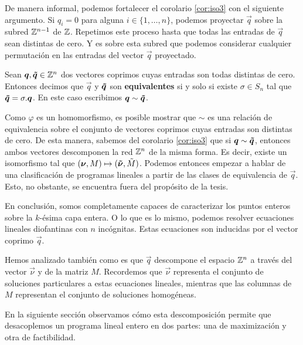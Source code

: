De manera informal, podemos fortalecer el corolario \ref{cor:iso3} con el siguiente argumento. Si
$q_i = 0$ para alguna $i \in \lbrace 1, \ldots, n \rbrace$, podemos proyectar $\vec{q}$ sobre
la subred $\mathbb{Z}^{n-1}$ de $\mathbb{Z}$. Repetimos este proceso hasta que todas las entradas de $\vec{q}$ sean
distintas de cero. Y es sobre esta subred que podemos considerar cualquier permutación en las
entradas del vector $\vec{q}$ proyectado.
\begin{definition}
	Sean $\boldsymbol{q}, \boldsymbol{\tilde{q}} \in \mathbb{Z}^n$ dos vectores coprimos cuyas entradas son todas
	distintas de cero. Entonces decimos que $\vec{q}$ y $\boldsymbol{\tilde{q}}$ son \textbf{equivalentes} si y solo
	si existe $\sigma \in S_n$ tal que $\boldsymbol{\tilde{q}} = \sigma.\boldsymbol{q}$. En este caso escribimos
	$\boldsymbol{q} \sim \boldsymbol{\tilde{q}}$.
\end{definition}
Como $\varphi$ es un homomorfismo, es posible mostrar que $\sim$ es una relación de equivalencia
sobre el conjunto de vectores coprimos cuyas entradas son distintas de cero. De esta manera, sabemos
del corolario \ref{cor:iso3} que si $\boldsymbol{q} \sim \boldsymbol{\tilde{q}}$, entonces ambos vectores
descomponen la red $\mathbb{Z}^n$ de la misma forma. Es decir, existe un isomorfismo tal que $(\boldsymbol{\nu},
M) \mapsto (\boldsymbol{\tilde{\nu}}, \tilde{M})$. Podemos entonces empezar a hablar de una
clasificación de programas lineales a partir de las clases de equivalencia de $\vec{q}$. Esto, no
obstante, se encuentra fuera del propósito de la tesis.

En conclusión, somos completamente capaces de caracterizar los puntos enteros sobre la $k$-ésima
capa entera. O lo que es lo mismo, podemos resolver ecuaciones lineales diofantinas con $n$
incógnitas. Estas ecuaciones son inducidas por el vector coprimo $\vec{q}$.

Hemos analizado también como es que $\vec{q}$ descompone el espacio $\mathbb{Z}^n$ a través del vector
$\vec{\nu}$ y de la matriz $M$. Recordemos que $\vec{\nu}$ representa el conjunto de soluciones
particulares a estas ecuaciones lineales, mientras que las columnas de $M$ representan el conjunto
de soluciones homogéneas.

En la siguiente sección observamos cómo esta descomposición permite que desacoplemos un programa
lineal entero en dos partes: una de maximización y otra de factibilidad.

